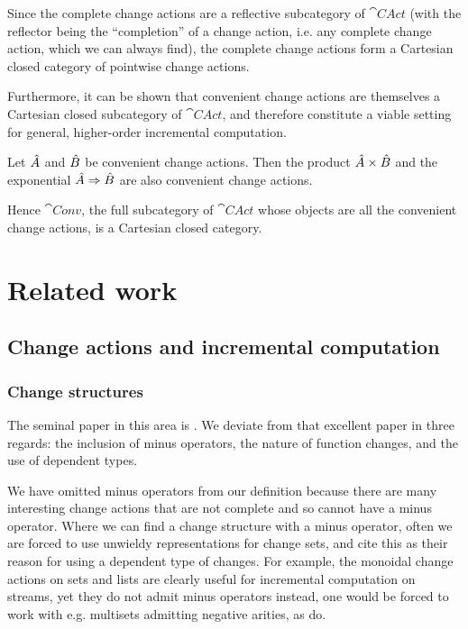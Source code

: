 Since the complete change actions are a reflective subcategory of
$\cat{CAct}$ (with the reflector being the ``completion'' of a change action,
i.e. any complete change action, which we can always find), the complete change
actions form a Cartesian closed category of pointwise change actions.

Furthermore, it can be shown that convenient change actions are themselves a Cartesian closed
subcategory of $\cat{CAct}$, and therefore constitute a viable setting for general, higher-order
incremental computation.

\begin{prop}[name=Convenient category of change actions]
  Let $\hat{A}$ and $\hat{B}$ be convenient change actions. Then the product 
  $\hat{A} \times \hat{B}$ and the exponential $\hat{A} \Rightarrow \hat{B}$ are also convenient
  change actions.
  
  Hence $\cat{Conv}$, the full subcategory of $\cat{CAct}$ whose objects are all the convenient change
  actions, is a Cartesian closed category.
\end{prop}

\section{Related work}

\subsection{Change actions and incremental computation}

\subsubsection{Change structures}
\label{sec:relatedChangeStructures}

The seminal paper in this area is \textcite{cai2014changes}. We deviate from
that excellent paper in three regards: the
inclusion of minus operators, the nature of function changes, and the use of
dependent types.

We have omitted minus operators from our definition because
there are many interesting change actions that are not complete and so cannot
have a minus operator. Where we can find a change structure with a minus operator, often we are
forced to use unwieldy representations for change sets, and
\citeauthor{cai2014changes} cite this as their reason for using a dependent
type of changes. For example, the monoidal change actions on sets and lists are clearly
useful for incremental computation on streams, yet they do not admit minus
operators \textemdash{} instead, one would
be forced to work with e.g. multisets admitting negative arities, as \citeauthor{cai2014changes} do.

